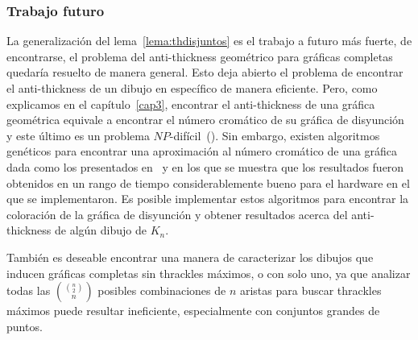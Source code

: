 \subsubsection{Trabajo futuro}

La generalización del lema~\ref{lema:thdisjuntos} es el trabajo a futuro más fuerte, de encontrarse, el
problema del anti-thickness geométrico para gráficas completas quedaría resuelto de manera general. Esto
deja abierto el problema de encontrar el anti-thickness de un dibujo en específico de manera eficiente.
Pero, como explicamos en el capítulo~\ref{cap3}, encontrar el anti-thickness de una gráfica geométrica
equivale a encontrar el número cromático de su gráfica de disyunción y este último es un problema
$NP$-difícil~(\cite{Skiena2003}). Sin embargo, existen algoritmos genéticos para encontrar una aproximación
al número cromático de una gráfica dada como los presentados en~\cite{Fleurent1996} y \cite{Galinier1999}
en los que se muestra que los resultados fueron obtenidos en un rango de tiempo considerablemente bueno
para el hardware en el que se implementaron. Es posible implementar estos algoritmos para encontrar la
coloración de la gráfica de disyunción y obtener resultados acerca del anti-thickness de algún dibujo de
$K_n$.

También es deseable encontrar una manera de caracterizar los dibujos que inducen gráficas completas sin
thrackles máximos, o con solo uno, ya que analizar todas las $\displaystyle \binom{\binom{n}{2}}{n}$
posibles combinaciones de $n$ aristas para buscar thrackles máximos puede resultar ineficiente,
especialmente con conjuntos grandes de puntos.
